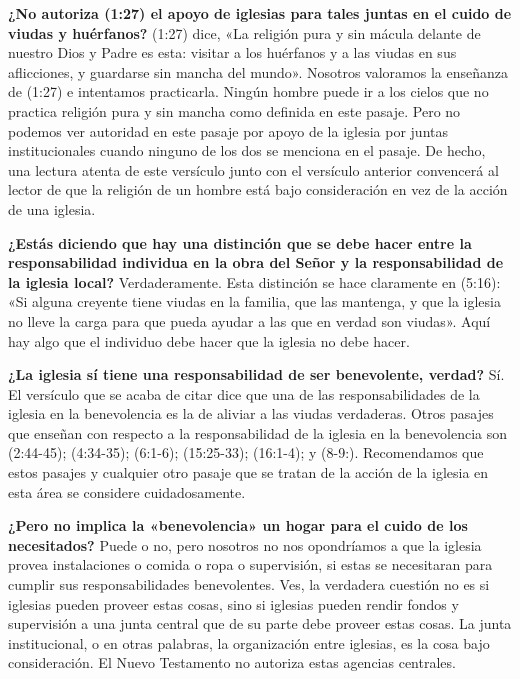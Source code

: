 \documentclass[12pt, twoside, openright]{book}
\begin{document}
\textbf{¿No autoriza (1:27) el apoyo de iglesias para tales juntas en el cuido de viudas y huérfanos?} (1:27) dice, «La religión pura y sin mácula delante de nuestro Dios y Padre es esta: visitar a los huérfanos y a las viudas en sus aflicciones, y guardarse sin mancha del mundo». Nosotros valoramos la enseñanza de (1:27) e intentamos practicarla. Ningún hombre puede ir a los cielos que no practica religión pura y sin mancha como definida en este pasaje. Pero no podemos ver autoridad en este pasaje por apoyo de la iglesia por juntas institucionales cuando ninguno de los dos se menciona en el pasaje. De hecho, una lectura atenta de este versículo junto con el versículo anterior convencerá al lector de que la religión de un hombre está bajo consideración en vez de la acción de una iglesia.

\textbf{¿Estás diciendo que hay una distinción que se debe hacer entre la responsabilidad individua en la obra del Señor y la responsabilidad de la iglesia local?} Verdaderamente. Esta distinción se hace claramente en (5:16): «Si alguna creyente tiene viudas en la familia, que las mantenga, y que la iglesia no lleve la carga para que pueda ayudar a las que en verdad son viudas». Aquí hay algo que el individuo debe hacer que la iglesia no debe hacer.

\textbf{¿La iglesia sí tiene una responsabilidad de ser benevolente, verdad?} Sí. El versículo que se acaba de citar dice que una de las responsabilidades de la iglesia en la benevolencia es la de aliviar a las viudas verdaderas. Otros pasajes que enseñan con respecto a la responsabilidad de la iglesia en la benevolencia son (2:44-45); (4:34-35); (6:1-6); (15:25-33); (16:1-4); y (8-9:). Recomendamos que estos pasajes y cualquier otro pasaje que se tratan de la acción de la iglesia en esta área se considere cuidadosamente. 

\textbf{¿Pero no implica la «benevolencia» un hogar para el cuido de los necesitados?} Puede o no, pero nosotros no nos opondríamos a que la iglesia provea instalaciones o comida o ropa o supervisión, si estas se necesitaran para cumplir sus responsabilidades benevolentes. Ves, la verdadera cuestión no es si iglesias pueden proveer estas cosas, sino si iglesias pueden rendir fondos y supervisión a una junta central que de su parte debe proveer estas cosas. La junta institucional, o en otras palabras, la organización entre iglesias, es la cosa bajo consideración. El Nuevo Testamento no autoriza estas agencias centrales. 
\end{document}
